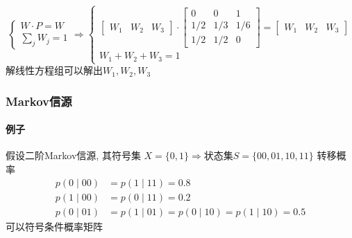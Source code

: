 \documentclass[a4paper]{report}
\begin{document}
  \[
  \begin{cases}
    W\cdot P=W \\
    \displaystyle\sum_{j} W_j=1
  \end{cases}
  \Rightarrow
  \begin{cases}
    \begin{bmatrix}
      W_1&W_2&W_3
    \end{bmatrix}
    \cdot 
      \begin{bmatrix}
    0&0&1\\
    1/2&1/3&1/6\\
    1/2&1/2&0
  \end{bmatrix}
    =
        \begin{bmatrix}
      W_1&W_2&W_3
    \end{bmatrix}
    \\
    W_1+W_2+W_3=1
  \end{cases}
\]
解线性方程组可以解出$W_1,W_2,W_3$

\subsubsection{Markov信源}
\paragraph{例子}
假设二阶Markov信源, 其符号集
$X=\{0,1\}\Rightarrow$状态集$S=\{00,01,10,11\}$
转移概率
\begin{align*}
p(0\mid 00)&=p(1\mid 11)=0.8
\\ p(1\mid 00)&=p(0\mid 11)=0.2
\\ p(0\mid 01)&=p(1\mid 01)=p(0\mid 10)=p(1\mid 10)=0.5
\end{align*}
可以符号条件概率矩阵 
\end{document}
